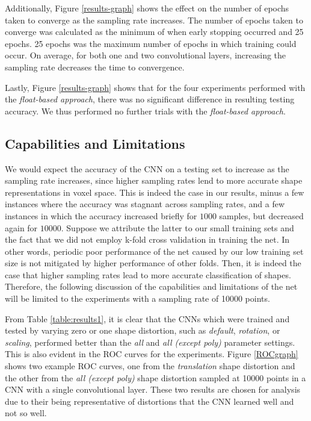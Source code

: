 \documentclass{article}
\begin{document}
Additionally, Figure \ref{results-graph} shows the effect on the number of epochs taken to converge as the sampling rate increases. The number of epochs taken to converge was calculated as the minimum of when early stopping occurred and 25 epochs. 25 epochs was the maximum number of epochs in which training could occur. On average, for both one and two convolutional layers, increasing the sampling rate decreases the time to convergence.

Lastly, Figure \ref{results-graph} shows that for the four experiments performed with the \textit{float-based approach}, there was no significant difference in resulting testing accuracy. We thus performed no further trials with the \textit{float-based approach}.

\subsection{Capabilities and Limitations}
We would expect the accuracy of the CNN on a testing set to increase as the sampling rate increases, since higher sampling rates lend to more accurate shape representations in voxel space. This is indeed the case in our results, minus a few instances where the accuracy was stagnant across sampling rates, and a few instances in which the accuracy increased briefly for $1000$ samples, but decreased again for $10000$. Suppose we attribute the latter to our small training sets and the fact that we did not employ k-fold cross validation in training the net. In other words, periodic poor performance of the net caused by our low training set size is not mitigated by higher performance of other folds. Then, it is indeed the case that higher sampling rates lead to more accurate classification of shapes. Therefore, the following discussion of the capabilities and limitations of the net will be limited to the experiments with a sampling rate of 10000 points.

From Table \ref{table:results1}, it is clear that the CNNs which were trained and tested by varying zero or one shape distortion, such as \textit{default}, \textit{rotation}, or \textit{scaling}, performed better than
the \textit{all} and \textit{all (except poly)} parameter settings. This is also evident in the ROC curves for the experiments. Figure \ref{ROCgraph} shows two example ROC curves, one from the \textit{translation} shape distortion and the other from the \textit{all (except poly)} shape distortion sampled at 10000 points in a CNN with a single convolutional layer. These two results are chosen for analysis due to their being representative of distortions that the CNN learned well and not so well.
\end{document}
